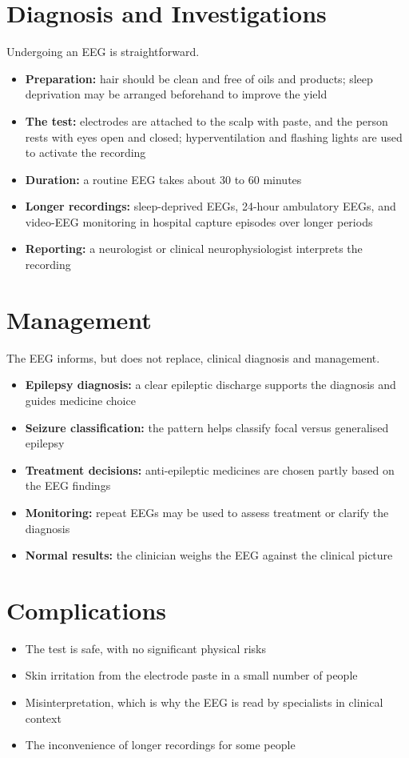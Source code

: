 \section*{Diagnosis and Investigations}
Undergoing an EEG is straightforward.
\begin{itemize}
    \item \textbf{Preparation:} hair should be clean and free of oils and products; sleep deprivation may be arranged beforehand to improve the yield
    \item \textbf{The test:} electrodes are attached to the scalp with paste, and the person rests with eyes open and closed; hyperventilation and flashing lights are used to activate the recording
    \item \textbf{Duration:} a routine EEG takes about 30 to 60 minutes
    \item \textbf{Longer recordings:} sleep-deprived EEGs, 24-hour ambulatory EEGs, and video-EEG monitoring in hospital capture episodes over longer periods
    \item \textbf{Reporting:} a neurologist or clinical neurophysiologist interprets the recording
\end{itemize}

\section*{Management}
The EEG informs, but does not replace, clinical diagnosis and management.
\begin{itemize}
    \item \textbf{Epilepsy diagnosis:} a clear epileptic discharge supports the diagnosis and guides medicine choice
    \item \textbf{Seizure classification:} the pattern helps classify focal versus generalised epilepsy
    \item \textbf{Treatment decisions:} anti-epileptic medicines are chosen partly based on the EEG findings
    \item \textbf{Monitoring:} repeat EEGs may be used to assess treatment or clarify the diagnosis
    \item \textbf{Normal results:} the clinician weighs the EEG against the clinical picture
\end{itemize}

\section*{Complications}
\begin{itemize}
    \item The test is safe, with no significant physical risks
    \item Skin irritation from the electrode paste in a small number of people
    \item Misinterpretation, which is why the EEG is read by specialists in clinical context
    \item The inconvenience of longer recordings for some people
\end{itemize}

